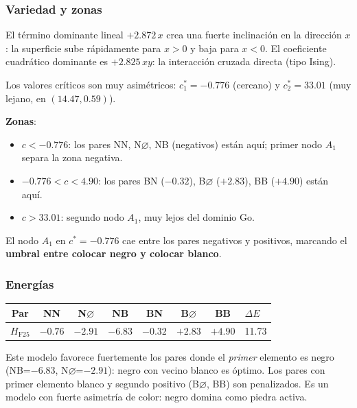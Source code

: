 \documentclass[11pt,a4paper]{article}
\newcommand{\dE}{\Delta E}
\begin{document}
\subsubsection*{Variedad y zonas}

El término dominante lineal $+2.872\,x$ crea una fuerte inclinación
en la dirección $x$: la superficie sube rápidamente para $x>0$
y baja para $x<0$.
El coeficiente cuadrático dominante es $+2.825\,xy$:
la interacción cruzada directa (tipo Ising).

Los valores críticos son muy asimétricos: $c^*_1=-0.776$ (cercano)
y $c^*_2=33.01$ (muy lejano, en $(14.47, 0.59)$).

\textbf{Zonas}:
\begin{itemize}[noitemsep]
  \item $c < -0.776$: los pares NN, N$\varnothing$, NB (negativos) están aquí;
        primer nodo $A_1$ separa la zona negativa.
  \item $-0.776 < c < 4.90$: los pares BN ($-0.32$), B$\varnothing$ ($+2.83$),
        BB ($+4.90$) están aquí.
  \item $c > 33.01$: segundo nodo $A_1$, muy lejos del dominio Go.
\end{itemize}

El nodo $A_1$ en $c^*=-0.776$ cae entre los pares negativos y positivos,
marcando el \textbf{umbral entre colocar negro y colocar blanco}.

\subsubsection*{Energías}

\begin{center}
\begin{tabular}{ccccccc}
  \toprule
  Par & NN & N$\varnothing$ & NB & BN & B$\varnothing$ & BB & $\dE$ \\
  \midrule
  $H_{\text{F25}}$ & $-0.76$ & $-2.91$ & $-6.83$ & $-0.32$ & $+2.83$ & $+4.90$ & 11.73 \\
  \bottomrule
\end{tabular}
\end{center}

\begin{tcolorbox}[notebox,title={Lectura estratégica}]
Este modelo favorece fuertemente los pares donde el \emph{primer} elemento
es negro (NB=$-6.83$, N$\varnothing$=$-2.91$): negro con vecino blanco es
óptimo. Los pares con primer elemento blanco y segundo positivo
(B$\varnothing$, BB) son penalizados. Es un modelo con fuerte asimetría
de color: negro domina como piedra activa.
\end{tcolorbox}
\end{document}
